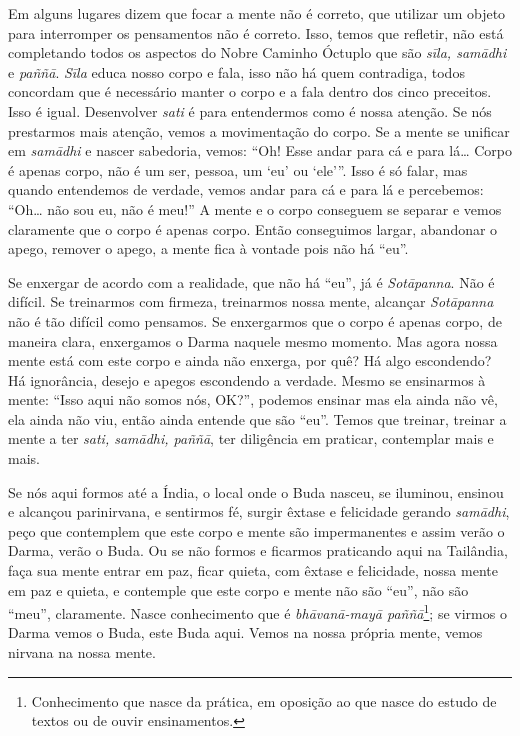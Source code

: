 Em alguns lugares dizem que focar a mente não é correto, que
utilizar um objeto para interromper os pensamentos não é correto. Isso,
temos que refletir, não está completando todos os aspectos do Nobre
Caminho Óctuplo que são \textit{sīla, sam\=adhi }e\textit{ paññ\=a}.
\textit{Sīla} educa nosso corpo e fala, isso não há quem contradiga,
todos concordam que é necessário manter o corpo e a fala dentro dos
cinco preceitos. Isso é igual. Desenvolver \textit{sati} é para
entendermos como é nossa atenção. Se nós prestarmos mais atenção, vemos
a movimentação do corpo. Se a mente se unificar em \textit{sam\=adhi} e
nascer sabedoria, vemos: “Oh! Esse andar para cá e para lá… Corpo é
apenas corpo, não é um ser, pessoa, um ‘eu’ ou ‘ele’”. Isso é só falar,
mas quando entendemos de verdade, vemos andar para cá e para lá e
percebemos: “Oh… não sou eu, não é meu!” A mente e o corpo conseguem se
separar e vemos claramente que o corpo é apenas corpo. Então
conseguimos largar, abandonar o apego, remover o apego, a mente fica à
vontade pois não há “eu”. 

Se enxergar de acordo com a realidade, que não há “eu”, já é
\textit{Sot\=apanna}. Não é difícil. Se treinarmos com firmeza,
treinarmos nossa mente, alcançar \textit{Sot\=apanna} não é tão difícil
como pensamos. Se enxergarmos que o corpo é apenas corpo, de maneira
clara, enxergamos o Darma naquele mesmo momento. Mas agora nossa mente
está com este corpo e ainda não enxerga, por quê? Há algo escondendo?
Há ignorância, desejo e apegos escondendo a verdade. Mesmo se
ensinarmos à mente: “Isso aqui não somos nós, OK?”, podemos ensinar mas
ela ainda não vê, ela ainda não viu, então ainda entende que são “eu”.
Temos que treinar, treinar a mente a ter \textit{sati, sam\=adhi,
paññ\=a}, ter diligência em praticar, contemplar mais e mais. 

Se nós aqui formos até a Índia, o local onde o Buda nasceu, se
iluminou, ensinou e alcançou parinirvana, e sentirmos fé, surgir êxtase
e felicidade gerando \textit{sam\=adhi}, peço que contemplem que este
corpo e mente são impermanentes e assim verão o Darma, verão o Buda. Ou
se não formos e ficarmos praticando aqui na Tailândia, faça sua mente
entrar em paz, ficar quieta, com êxtase e felicidade, nossa mente em
paz e quieta, e contemple que este corpo e mente não são “eu”, não são
“meu”, claramente. Nasce conhecimento que é \textit{bh\=avan\=a-may\=a
paññ\=a}\footnote{Conhecimento que nasce da prática, em oposição ao que
nasce do estudo de textos ou de ouvir ensinamentos.}; se virmos o Darma
vemos o Buda, este Buda aqui. Vemos na nossa própria mente, vemos
nirvana na nossa mente. 

